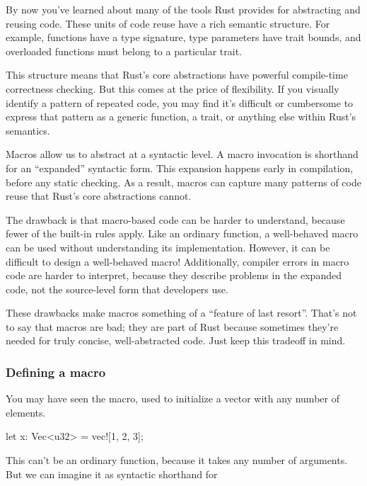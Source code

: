 By now you've learned about many of the tools Rust provides for abstracting and reusing code. These units of code reuse have a rich 
semantic structure. For example, functions have a type signature, type parameters have trait bounds, and overloaded functions must 
belong to a particular trait.

\blank

This structure means that Rust's core abstractions have powerful compile-time correctness checking. But this comes at the price of 
flexibility. If you visually identify a pattern of repeated code, you may find it's difficult or cumbersome to express that pattern 
as a generic function, a trait, or anything else within Rust's semantics.

\blank

Macros allow us to abstract at a syntactic level. A macro invocation is shorthand for an \enquote{expanded} syntactic form. This 
expansion happens early in compilation, before any static checking. As a result, macros can capture many patterns of code reuse that 
Rust's core abstractions cannot.

\blank

The drawback is that macro-based code can be harder to understand, because fewer of the built-in rules apply. Like an ordinary 
function, a well-behaved macro can be used without understanding its implementation. However, it can be difficult to design a 
well-behaved macro! Additionally, compiler errors in macro code are harder to interpret, because they describe problems in the 
expanded code, not the source-level form that developers use.

\blank

These drawbacks make macros something of a \enquote{feature of last resort}. That's not to say that macros are bad; they are part of 
Rust because sometimes they're needed for truly concise, well-abstracted code. Just keep this tradeoff in mind.

\subsubsection*{Defining a macro}

You may have seen the  macro, used to initialize a vector with any number of elements.

\begin{rustc}
let x: Vec<u32> = vec![1, 2, 3];
\end{rustc}

This can't be an ordinary function, because it takes any number of arguments. But we can imagine it as syntactic shorthand for

